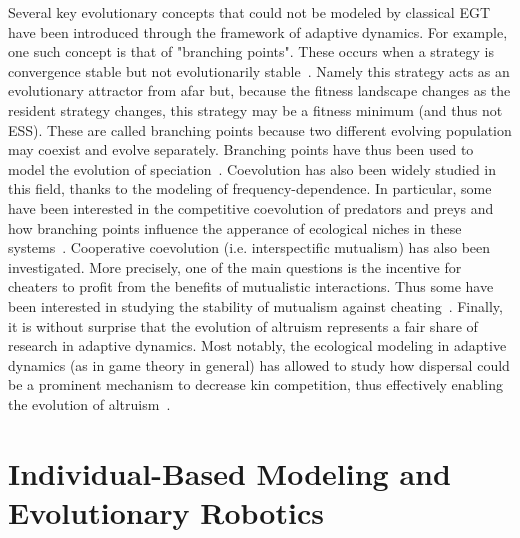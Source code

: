     Several key evolutionary concepts that could not be modeled by classical EGT have been introduced through the framework of adaptive dynamics. For example, one such concept is that of "branching points". These occurs when a strategy is convergence stable but not evolutionarily stable~\parencite{Geritz1998}. Namely this strategy acts as an evolutionary attractor from afar but, because the fitness landscape changes as the resident strategy changes, this strategy may be a fitness minimum (and thus not ESS). These are called branching points because two different evolving population may coexist and evolve separately. Branching points have thus been used to model the evolution of speciation~\parencite{Geritz2004}. Coevolution has also been widely studied in this field, thanks to the modeling of frequency-dependence. In particular, some have been interested in the competitive coevolution of predators and preys and how branching points influence the apperance of ecological niches in these systems~\parencite{Bowers2003}. Cooperative coevolution (i.e. interspectific mutualism) has also been investigated. More precisely, one of the main questions is the incentive for cheaters to profit from the benefits of mutualistic interactions. Thus some have been interested in studying the stability of mutualism against cheating~\parencite{Ferriere2002, McGill2005}. Finally, it is without surprise that the evolution of altruism represents a fair share of research in adaptive dynamics. Most notably, the ecological modeling in adaptive dynamics (as in game theory in general) has allowed to study how dispersal could be a prominent mechanism to decrease kin competition, thus effectively enabling the evolution of altruism~\parencite{LeGalliard2003, LeGalliard2005}.




\section{Individual-Based Modeling and Evolutionary Robotics}

